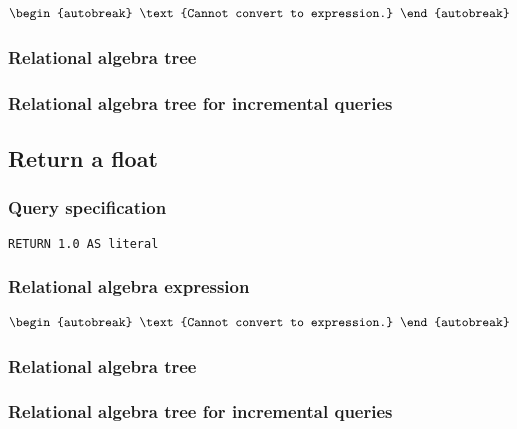 \begin{align*}
\begin{autobreak}
\text{Cannot convert to expression.}
\end{autobreak}
\end{align*}

\subsubsection*{Relational algebra tree}


\subsubsection*{Relational algebra tree for incremental queries}


\subsection{Return a float}

\subsubsection*{Query specification}

\begin{lstlisting}
RETURN 1.0 AS literal
\end{lstlisting}

\subsubsection*{Relational algebra expression}

\begin{align*}
\begin{autobreak}
\text{Cannot convert to expression.}
\end{autobreak}
\end{align*}

\subsubsection*{Relational algebra tree}


\subsubsection*{Relational algebra tree for incremental queries}


